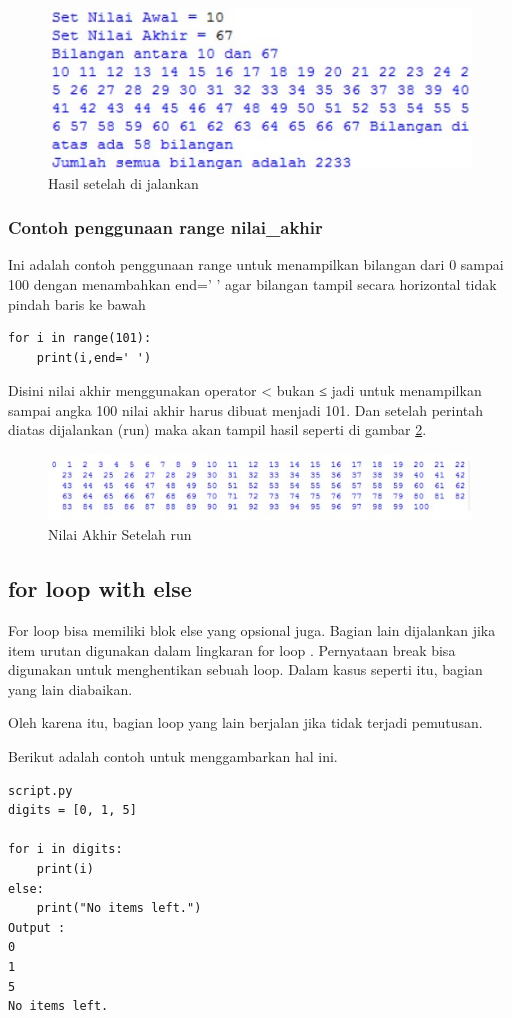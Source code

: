 \begin{figure}[ht]
    \centerline{\includegraphics[width=.5\textwidth]{figures/2range2.JPG}}
    \caption{Hasil setelah di jalankan}
    \label{2range2}
    \end{figure}
    
\subsubsection{Contoh penggunaan range nilai\_akhir}
Ini adalah contoh penggunaan range untuk menampilkan bilangan dari 0 sampai 100 dengan menambahkan end=’ ’ agar bilangan tampil secara horizontal tidak pindah baris ke bawah
\begin{verbatim}
for i in range(101):
	print(i,end=' ')
\end{verbatim}
Disini nilai akhir menggunakan operator < bukan ≤ jadi untuk menampilkan sampai angka 100 nilai akhir harus dibuat menjadi 101. Dan setelah perintah diatas dijalankan (run) maka akan tampil hasil seperti di gambar \ref{2range3}.

\begin{figure}[ht]
    \centerline{\includegraphics[width=1\textwidth]{figures/2range3.JPG}}
    \caption{Nilai Akhir Setelah run}
    \label{2range3}
    \end{figure}

\subsection{for loop with else}
For loop bisa memiliki blok else yang opsional juga. Bagian lain dijalankan jika item urutan digunakan dalam lingkaran for loop .
Pernyataan break bisa digunakan untuk menghentikan sebuah loop. Dalam kasus seperti itu, bagian yang lain diabaikan.

Oleh karena itu, bagian loop yang lain berjalan jika tidak terjadi pemutusan.

Berikut adalah contoh untuk menggambarkan hal ini.
\begin{verbatim}
script.py 
digits = [0, 1, 5]

for i in digits:
    print(i)
else:
    print("No items left.")
Output :
0
1
5
No items left.
\end{verbatim}

